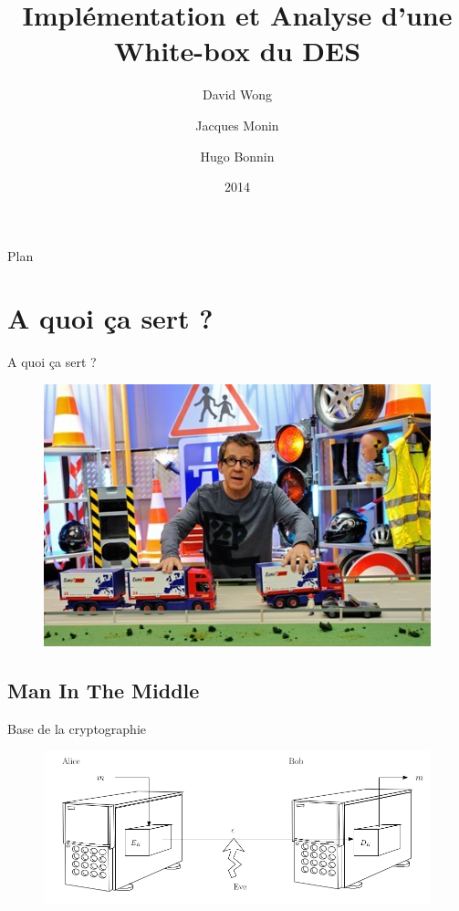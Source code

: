 \documentclass{beamer}
\author{David Wong
  \and Jacques Monin
  \and Hugo Bonnin}
\title{Implémentation et Analyse d'une White-box du DES}
\institute{Université de Bordeaux}
\date{2014}
\begin{document}
\begin{frame}
  \titlepage
\end{frame}

\begin{frame}{Plan}
  \tableofcontents
\end{frame}

\section{A quoi ça sert ?}

\begin{frame}{A quoi ça sert ?}

\begin{figure}[h]
    \centering
    \includegraphics[scale=0.6]{./images/kezako.jpg}
  \end{figure}

\end{frame}

\subsection{Man In The Middle}

\begin{frame}{Base de la cryptographie}

  \begin{figure}[h]
    \centering
    \includegraphics[scale=0.50]{./images/alice_bob.png}
  \end{figure}

\end{frame}
\end{document}
